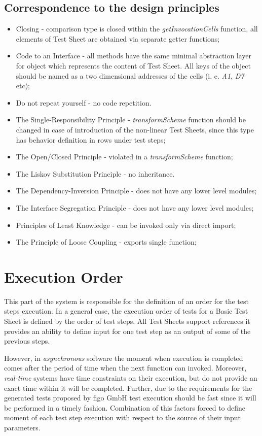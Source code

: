 \subsection{Correspondence to the  design principles}
\begin{itemize}
	\item Closing - comparison type is closed within the \textit{getInvocationCells} function, all elements of Test Sheet are obtained via separate getter functions;
	\item Code to an Interface - all methods have the same minimal abstraction layer for object which represents the content of Test Sheet. All keys of the object should be named as a two dimensional addresses of the cells (i. e. \textit{A1}, \textit{D7} etc);
	\item Do not repeat yourself - no code repetition.
	\item The Single-Responsibility Principle - \textit{transformScheme} function should be changed in case of introduction of the non-linear Test Sheets, since this type has behavior definition in rows under test steps;
	\item The Open/Closed Principle - violated in a \textit{transformScheme} function;
	\item The Liskov Substitution Principle - no inheritance.
	\item The Dependency-Inversion Principle - does not have any lower level modules;
	\item The Interface Segregation Principle - does not have any lower level modules;
	\item Principles of Least Knowledge - can be invoked only via direct import;
	\item The Principle of Loose Coupling - exports single function;
\end{itemize}

\section{Execution Order}
\label{sec:execOrder}
This part of the system is responsible for the definition of an order for the test steps execution. In a general case, the execution order of tests for a Basic Test Sheet is defined by the order of test steps. 
All Test Sheets support references it provides an ability to define input for one test step as an output of some of the previous steps.


However, in \textit{asynchronous} software the moment when execution is completed comes after the period of time when the next function can invoked. Moreover, \textit{real-time} systems have time constraints on their execution, but do not provide an exact time within it will be completed. Further, due to the requirements for the generated tests proposed by figo GmbH test execution should be fast since it will be performed in a timely fashion. Combination of this factors forced to define moment of each test step execution with respect to the source of their input parameters.


